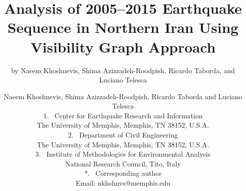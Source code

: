 

\posttitle{
    \end{flushleft}
}




\predate{
    \begin{flushleft}
    \makeatletter
}

\postdate{
    \end{flushleft}
}

\title{%
    Analysis of 2005--2015 Earthquake Sequence in Northern Iran Using Visibility Graph Approach
}

\makeatletter
\if@twocolumn
    \date{}
    \renewcommand*\@fnsymbol[1]{\the#1}
    \author{by Naeem Khoshnevis, Shima Azizzadeh-Roodpish, Ricardo Taborda, and Luciano Telesca}
\else
    \author{
    	Naeem Khoshnevis, Shima Azizzadeh-Roodpish, Ricardo Taborda and Luciano Telesca\\
    	\normalsize\normalfont    	    	
        \vspace{20pt}
    	1.~
    	Center for Earthquake Research and Information\\
    	\hspace{1.1em} The University of Memphis, Memphis, TN 38152, U.S.A.\\
        \vspace{20pt}
        2.~
        Department of Civil Engineering\\
        \hspace{1.1em} The University of Memphis, Memphis, TN 38152, U.S.A.\\
        \vspace{20pt}
        3.~
        Institute of Methodologies for Environmental Analysis\\
        \hspace{1.1em} National Research Council, Tito, Italy\\
        \vspace{20pt}
        *.~
    	Corresponding author\\
    	\hspace{1.1em} Email: nkhshnvs@memphis.edu\\
        \vspace{40pt}
    }
\fi
\makeatother

